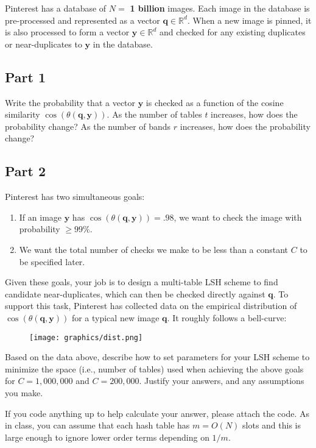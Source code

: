 \documentclass{article}
\begin{document}
Pinterest has a database of $N = $ \textbf{1 billion} images. Each image in the database is pre-processed and represented as a vector $\mathbf{q}\in \mathbb{R}^d$. When a new image is pinned, it is also processed to form a vector $\mathbf{y} \in \mathbb{R}^d$ and checked for any existing duplicates or near-duplicates to $\mathbf{y}$ in the database. 

\subsection*{Part 1}
Write the probability that a vector $\mathbf{y}$ is checked as a function of the cosine similarity $\cos( \theta(\mathbf{q}, \mathbf{y}))$.
As the number of tables $t$ increases, how does the probability change?
As the number of bands $r$ increases, how does the probability change?

\subsection*{Part 2}

Pinterest has two simultaneous goals:
\begin{enumerate}
    \item If an image $\mathbf{y}$ has $\cos( \theta(\mathbf{q}, \mathbf{y})) =.98$, we want to check the image with probability $\geq 99\%$.
    \item We want the total number of checks we make to be less than a constant $C$ to be specified later.
\end{enumerate}

Given these goals, your job is to design a multi-table LSH scheme to find candidate near-duplicates, which can then be checked directly against $\mathbf{q}$.
To support this task, Pinterest has collected data on the empirical distribution of $\cos(\theta(\mathbf{q},\mathbf{y}))$ for a typical new image $\mathbf{q}$.
It roughly follows a bell-curve:

\begin{figure}[h]
	\centering
	\texttt{[image: graphics/dist.png]}
\end{figure} 

Based on the data above, describe how to set parameters for your LSH scheme to minimize the space (i.e., number of tables) used when achieving the above goals for $C=1,000,000$ and $C=200,000$.
Justify your answers, and any assumptions you make.

If you code anything up to help calculate your answer, please attach the code. As in class, you can assume that each hash table has $m = O(N)$ slots and this is large enough to ignore lower order terms depending on $1/m$. 

%
\end{document}
